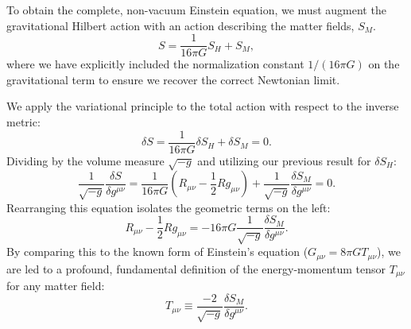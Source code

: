 \documentclass[11pt, a4paper]{report}
\begin{document}
To obtain the complete, non-vacuum Einstein equation, we must augment the gravitational Hilbert action with an action describing the matter fields, $S_{M}$. %
\begin{equation}
\label{eq:total_action}
S = \frac{1}{16\pi G} S_{H} + S_{M}, %
\end{equation}
where we have explicitly included the normalization constant $1/(16\pi G)$ on the gravitational term to ensure we recover the correct Newtonian limit. %

We apply the variational principle to the total action with respect to the inverse metric:
\begin{equation}
\delta S = \frac{1}{16\pi G} \delta S_{H} + \delta S_{M} = 0.
\end{equation}
Dividing by the volume measure $\sqrt{-g}$ and utilizing our previous result for $\delta S_{H}$:
\begin{equation}
\frac{1}{\sqrt{-g}} \frac{\delta S}{\delta g^{\mu\nu}} = \frac{1}{16\pi G} \left( R_{\mu\nu} - \frac{1}{2}R g_{\mu\nu} \right) + \frac{1}{\sqrt{-g}} \frac{\delta S_{M}}{\delta g^{\mu\nu}} = 0. %
\end{equation}
Rearranging this equation isolates the geometric terms on the left:
\begin{equation}
R_{\mu\nu} - \frac{1}{2}R g_{\mu\nu} = -16\pi G \frac{1}{\sqrt{-g}} \frac{\delta S_{M}}{\delta g^{\mu\nu}}.
\end{equation}
By comparing this to the known form of Einstein's equation ($G_{\mu\nu} = 8\pi G T_{\mu\nu}$), we are led to a profound, fundamental definition of the energy-momentum tensor $T_{\mu\nu}$ for any matter field: %
\begin{equation}
\label{eq:hilbert_stress_energy}
T_{\mu\nu} \equiv \frac{-2}{\sqrt{-g}} \frac{\delta S_{M}}{\delta g^{\mu\nu}}. %
\end{equation}
\end{document}
